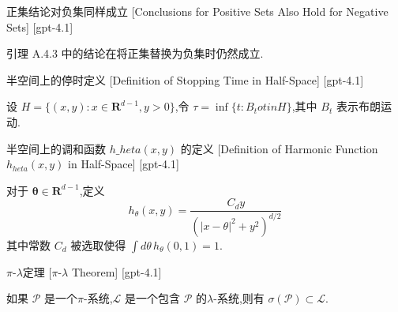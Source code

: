\documentclass[UTF8]{ctexart}
\begin{document}
    
    
    \begin{crl}
        {正集结论对负集同样成立}
        [Conclusions for Positive Sets Also Hold for Negative Sets]
        [gpt-4.1]
        
引理 A.4.3 中的结论在将正集替换为负集时仍然成立.

    \end{crl}
    
    
    
    \begin{dfn}
        {半空间上的停时定义}
        [Definition of Stopping Time in Half-Space]
        [gpt-4.1]
        
设 $H = \{ (x, y) : x \in \mathbf{R}^{d - 1}, y > 0 \}$,令 $\tau = \inf \{ t : B_{t} 
otin H \}$,其中 $B_t$ 表示布朗运动.

    \end{dfn}
    
    
    
    \begin{dfn}
        {半空间上的调和函数 $h\_{	heta}(x, y)$ 的定义}
        [Definition of Harmonic Function $h_{	heta}(x, y)$ in Half-Space]
        [gpt-4.1]
        
对于 $\boldsymbol{\theta} \in \mathbf{R}^{d - 1}$,定义
\[
h_{\theta}(x, y) = \frac{C_{d} y}{(|x - \theta|^{2} + y^{2})^{d / 2}}
\]
其中常数 $C_{d}$ 被选取使得 $\int d\theta\, h_{\theta}(0, 1) = 1$.

    \end{dfn}
    
    
    
    \begin{thm}
        {$\pi$-$\lambda$定理}
        [$\pi$-$\lambda$ Theorem]
        [gpt-4.1]
        
如果 $\mathcal{P}$ 是一个$\pi$-系统,$\mathcal{L}$ 是一个包含 $\mathcal{P}$ 的$\lambda$-系统,则有 $\sigma(\mathcal{P}) \subset \mathcal{L}$.

    \end{thm}
    
    
    
\end{document}
